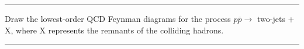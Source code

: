 \noindent\rule{7in}{1.5pt}


\begin{problem}{10.5}
Draw the lowest-order QCD Feynman diagrams for the process $p\overbar{p}\to$ two-jets + X, where X represents the remnants of the colliding hadrons.
\end{problem}
\begin{solution}

\end{solution}

\noindent\rule{7in}{1.5pt}


